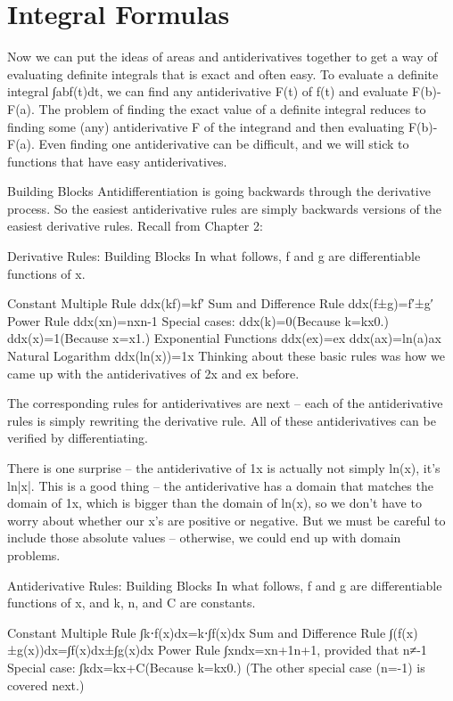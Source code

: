 \section{Integral Formulas}
\label{sec:formulas}
Now we can put the ideas of areas and antiderivatives together to get a way of evaluating definite integrals that is exact and often easy. To evaluate a definite integral ∫abf(t)dt, we can find any antiderivative F(t) of f(t) and evaluate F(b)-F(a). The problem of finding the exact value of a definite integral reduces to finding some (any) antiderivative F of the integrand and then evaluating F(b)-F(a). Even finding one antiderivative can be difficult, and we will stick to functions that have easy antiderivatives.

Building Blocks
Antidifferentiation is going backwards through the derivative process. So the easiest antiderivative rules are simply backwards versions of the easiest derivative rules. Recall from Chapter 2:

Derivative Rules: Building Blocks
In what follows, f and g are differentiable functions of x.

Constant Multiple Rule
ddx(kf)=kf′
Sum and Difference Rule
ddx(f±g)=f′±g′
Power Rule
ddx(xn)=nxn-1
Special cases:
ddx(k)=0(Because k=kx0.)
ddx(x)=1(Because x=x1.)
Exponential Functions
ddx(ex)=ex
ddx(ax)=ln(a)ax
Natural Logarithm
ddx(ln(x))=1x
Thinking about these basic rules was how we came up with the antiderivatives of 2x and ex before.

The corresponding rules for antiderivatives are next – each of the antiderivative rules is simply rewriting the derivative rule. All of these antiderivatives can be verified by differentiating.

There is one surprise – the antiderivative of 1x is actually not simply ln(x), it's ln|x|. This is a good thing – the antiderivative has a domain that matches the domain of 1x, which is bigger than the domain of ln(x), so we don’t have to worry about whether our x's are positive or negative. But we must be careful to include those absolute values – otherwise, we could end up with domain problems.

Antiderivative Rules: Building Blocks
In what follows, f and g are differentiable functions of x, and k, n, and C are constants.

Constant Multiple Rule
∫k⋅f(x)dx=k⋅∫f(x)dx
Sum and Difference Rule
∫(f(x)±g(x))dx=∫f(x)dx±∫g(x)dx
Power Rule
∫xndx=xn+1n+1, provided that n≠-1
Special case:
∫kdx=kx+C(Because k=kx0.)
(The other special case (n=-1) is covered next.)

